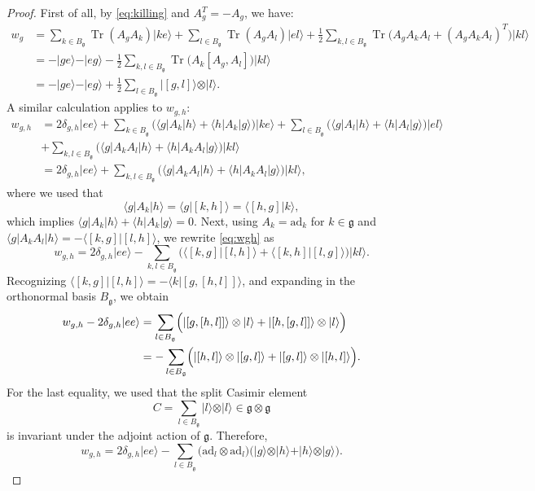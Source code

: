 \documentclass[a4paper]{article}
\newcommand{\ket}[1]{\vert #1 \rangle}
\newcommand{\bra}[1]{\langle #1 \vert}
\newcommand{\scalprod}[2]{\langle #1 \vert #2 \rangle}
\newcommand{\tr}{\operatorname{Tr}}
\newcommand{\ad}{\mathrm{ad}}
\theoremstyle{definition}
\begin{document}
\begin{proof}
First of all, by \cref{eq:killing} and $A_g^T = -A_g$, we have:
\begin{align*}
    w_g &=  \sum_{k\in B_{\mathfrak{g}}} \tr (A_g A_k) \ket{ke} +  \sum_{l\in B_{\mathfrak{g}}} \tr (A_g A_l) \ket{el} + \frac{1}{2} \sum_{k,l\in B_{\mathfrak{g}}} \tr \bigg( A_g A_k A_l + (A_g A_k A_l)^T \bigg) \ket{kl} \\
     &= -\ket{ge} -  \ket{eg} -  \frac{1}{2}\sum_{k,l\in B_{\mathfrak{g}}} \tr \bigl(A_k [A_g ,A_l] \bigr) \ket{kl} \\
     &= -\ket{ge} -  \ket{eg} + \frac{1}{2}\sum_{l\in B_{\mathfrak{g}}} \ket{[g,l]} \otimes \ket{l}.
\end{align*}
A similar calculation applies to $w_{g,h}$:
\begin{align*}
w_{g,h} &= 2\delta_{g,h} \ket{ee} + \sum_{k\in B_{\mathfrak{g}}} \bigl(\bra{g} A_k \ket{h} + \bra{h} A_k \ket{g}\bigr) \ket{ke} 
+ \sum_{l\in B_{\mathfrak{g}}} \bigl(\bra{g} A_l \ket{h} + \bra{h} A_l \ket{g}\bigr) \ket{el} \\
&+\sum_{k,l\in B_{\mathfrak{g}}} \bigl(\bra{g} A_k A_l \ket{h} + \bra{h} A_k A_l \ket{g}\bigr) \ket{kl} \\
&= 2\delta_{g,h} \ket{ee} + \sum_{k,l\in B_{\mathfrak{g}}} \bigl(\bra{g} A_k A_l \ket{h} + \bra{h} A_k A_l \ket{g}\bigr) \ket{kl},
\end{align*}
where we used that 
$$\bra{g} A_k \ket{h} = \scalprod{g}{[k,h]} = \scalprod{[h,g]}{k},$$
which implies $\bra{g} A_k \ket{h} + \bra{h} A_k \ket{g} = 0$.
Next, using $A_k = \ad_k$ for $k\in\mathfrak{g}$ and $\bra{g} A_k A_l \ket{h} = -\scalprod{[k,g]}{[l,h]}$, we rewrite \cref{eq:wgh} as
$$w_{g,h} = 2\delta_{g,h} \ket{ee} - \sum_{k,l \in B_\mathfrak{g}} \bigl( \scalprod{[k,g]}{[l,h]} + \scalprod{[k,h]}{[l,g]} \bigr) \ket{kl}.$$
Recognizing $\scalprod{[k,g]}{[l,h]} = -\scalprod{k}{[g,[h,l]]}$, and expanding in the orthonormal basis $B_\mathfrak{g}$, we obtain
\begin{align*}
w_{g,h} - 2\delta_{g,h} \ket{ee} 
&= \sum_{l\in B_{\mathfrak{g}}} \Bigl( \ket{[g,[h,l]]} \otimes \ket{l}+ \ket{[h,[g,l]]} \otimes \ket{l} \Bigr) \\
&= -\sum_{l\in B_{\mathfrak{g}}} \Bigl( \ket{[h,l]} \otimes \ket{[g,l]} + \ket{[g,l]} \otimes \ket{[h,l]} \Bigr).
\end{align*}
For the last equality, we used that the split Casimir element
$$C = \sum_{l\in B_{\mathfrak{g}}} \ket{l} \otimes \ket{l} \in \mathfrak{g} \otimes \mathfrak{g}$$
is invariant under the adjoint action of $\mathfrak{g}$.
Therefore,
$$w_{g,h} = 2\delta_{g,h} \ket{ee} 
- \sum_{l \in B_\mathfrak{g}} \bigl(\ad_l \otimes \ad_l\bigr) \bigl( \ket{g} \otimes \ket{h} + \ket{h} \otimes \ket{g} \bigr).$$


\end{proof}
\end{document}
